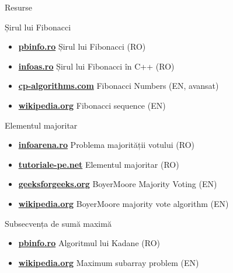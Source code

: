 ﻿\documentclass{beamer}
\begin{document}
\begin{frame}{Resurse}
  \begin{block}{Șirul lui Fibonacci}
    \begin{itemize}\footnotesize\itemsep0pt
      \item \href{https://www.pbinfo.ro/articole/5537/sirul-lui-fibonacci}{\textbf{pbinfo.ro}} \textemdash{} Șirul lui Fibonacci (RO)
      \item \href{https://infoas.ro/lectie/105/sirul-lui-fibonacci-in-c}{\textbf{infoas.ro}} \textemdash{} Șirul lui Fibonacci în C++ (RO)
      \item \href{https://cp-algorithms.com/algebra/fibonacci-numbers.html}{\textbf{cp-algorithms.com}} \textemdash{} Fibonacci Numbers (EN, avansat)
      \item \href{https://en.wikipedia.org/wiki/Fibonacci_sequence}{\textbf{wikipedia.org}} \textemdash{} Fibonacci sequence (EN)
    \end{itemize}
  \end{block}
  \vspace{-6pt}
  \begin{block}{Elementul majoritar}
    \begin{itemize}\footnotesize\itemsep0pt
      \item \href{https://infoarena.ro/problema-majoritatii-votului}{\textbf{infoarena.ro}} \textemdash{} Problema majorității votului (RO)
      \item \href{https://tutoriale-pe.net/elementul-majoritar-elmaj/}{\textbf{tutoriale-pe.net}} \textemdash{} Elementul majoritar (RO)
      \item \href{https://www.geeksforgeeks.org/theory-of-computation/boyer-moore-majority-voting-algorithm/}{\textbf{geeksforgeeks.org}} \textemdash{} Boyer\textendash{}Moore Majority Voting (EN)
      \item \href{https://en.wikipedia.org/wiki/Boyer\%E2\%80\%93Moore_majority_vote_algorithm}{\textbf{wikipedia.org}} \textemdash{} Boyer\textendash{}Moore majority vote algorithm (EN)
    \end{itemize}
  \end{block}
  \vspace{-6pt}
  \begin{block}{Subsecvența de sumă maximă}
    \begin{itemize}\footnotesize\itemsep0pt
      \item \href{https://www.pbinfo.ro/articole/32848/algoritmul-lui-kadane}{\textbf{pbinfo.ro}} \textemdash{} Algoritmul lui Kadane (RO)
      \item \href{https://en.wikipedia.org/wiki/Maximum_subarray_problem}{\textbf{wikipedia.org}} \textemdash{} Maximum subarray problem (EN)
    \end{itemize}
  \end{block}
\end{frame}
\end{document}
